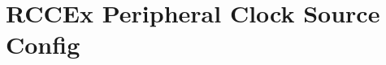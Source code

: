 \hypertarget{group___r_c_c_ex___peripheral___clock___source___config}{}\section{R\+C\+C\+Ex Peripheral Clock Source Config}
\label{group___r_c_c_ex___peripheral___clock___source___config}
